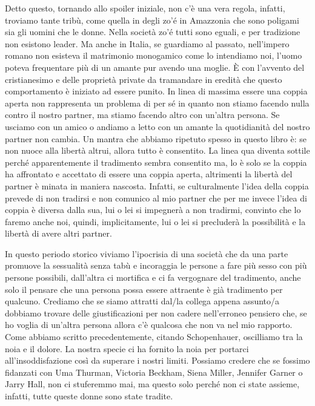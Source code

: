 \documentclass[12pt]{book} %
\begin{document}
Detto questo, tornando allo spoiler iniziale, non c'è una vera regola, infatti, troviamo tante
tribù, come quella in degli zo'é in Amazzonia che sono poligami sia gli uomini che le donne. Nella
società zo'é tutti sono eguali, e per tradizione non esistono leader. Ma anche in Italia, se
guardiamo al passato, nell'impero romano non esisteva il matrimonio monogamico come lo intendiamo noi, l'uomo poteva
frequentare più di un amante pur avendo una moglie. È con l'avvento del cristianesimo e delle
proprietà private da tramandare in eredità che questo comportamento è iniziato ad essere punito. In linea di massima
essere una coppia aperta non rappresenta un problema di per sé in quanto non stiamo facendo nulla contro il nostro
partner, ma stiamo facendo altro con un'altra persona. Se usciamo con un amico o andiamo a letto
con un amante la quotidianità del nostro partner non cambia. Un mantra che abbiamo ripetuto spesso in questo libro è:
se non nuoce alla libertà altrui, allora tutto è consentito. La linea qua diventa sottile perché apparentemente il
tradimento sembra consentito ma, lo è solo se la coppia ha affrontato e accettato di essere una coppia aperta,
altrimenti la libertà del partner è minata in maniera nascosta. Infatti, se culturalmente l'idea
della coppia prevede di non tradirsi e non comunico al mio partner che per me invece l'idea di
coppia è diversa dalla sua, lui o lei si impegnerà a non tradirmi, convinto che lo faremo anche noi, quindi,
implicitamente, lui o lei si precluderà la possibilità e la libertà di avere altri partner.

In questo periodo storico viviamo l'ipocrisia di una società che da una parte promuove la
sessualità senza tabù e incoraggia le persone a fare più sesso con più persone possibili,
dall'altra ci mortifica e ci fa vergognare del tradimento, anche solo il pensare che una persona
possa essere attraente è già tradimento per qualcuno. Crediamo che se siamo attratti dal/la collega appena assunto/a
dobbiamo trovare delle giustificazioni per non cadere nell'erroneo pensiero che, se ho voglia di
un'altra persona allora c'è qualcosa che non va nel mio rapporto. Come
abbiamo scritto precedentemente, citando Schopenhauer, oscilliamo tra la noia e il dolore. La nostra specie ci ha
fornito la noia per portarci all'insoddisfazione così da superare i nostri limiti. Possiamo
credere che se fossimo fidanzati con Uma Thurman, Victoria Beckham, Siena Miller, Jennifer Garner o Jarry Hall, non ci
stuferemmo mai, ma questo solo perché non ci state assieme, infatti, tutte queste donne sono state tradite.
\end{document}
